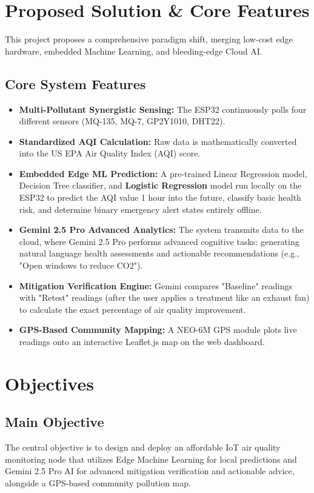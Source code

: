 \documentclass[12pt,a4paper]{report}
\begin{document}
\chapter{Proposed Solution \& Core Features}
This project proposes a comprehensive paradigm shift, merging low-cost edge hardware, embedded Machine Learning, and bleeding-edge Cloud AI.

\section{Core System Features}
\begin{itemize}[leftmargin=*, itemsep=12pt]
    \item \textbf{Multi-Pollutant Synergistic Sensing:} The ESP32 continuously polls four different sensors (MQ-135, MQ-7, GP2Y1010, DHT22).
    \item \textbf{Standardized AQI Calculation:} Raw data is mathematically converted into the US EPA Air Quality Index (AQI) score.
    \item \textbf{Embedded Edge ML Prediction:} A pre-trained Linear Regression model, Decision Tree classifier, and \textbf{Logistic Regression} model run locally on the ESP32 to predict the AQI value 1 hour into the future, classify basic health risk, and determine binary emergency alert states entirely offline.
    \item \textbf{Gemini 2.5 Pro Advanced Analytics:} The system transmits data to the cloud, where Gemini 2.5 Pro performs advanced cognitive tasks: generating natural language health assessments and actionable recommendations (e.g., "Open windows to reduce CO2").
    \item \textbf{Mitigation Verification Engine:} Gemini compares "Baseline" readings with "Retest" readings (after the user applies a treatment like an exhaust fan) to calculate the exact percentage of air quality improvement.
    \item \textbf{GPS-Based Community Mapping:} A NEO-6M GPS module plots live readings onto an interactive Leaflet.js map on the web dashboard.
\end{itemize}

\chapter{Objectives}
\section{Main Objective}
The central objective is to design and deploy an affordable IoT air quality monitoring node that utilizes Edge Machine Learning for local predictions and Gemini 2.5 Pro AI for advanced mitigation verification and actionable advice, alongside a GPS-based community pollution map.
\end{document}
